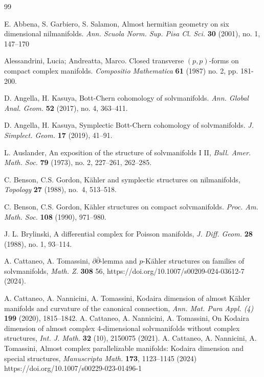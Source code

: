 \documentclass[a4paper, 11pt]{amsart}
\theoremstyle{plain}
\theoremstyle{definition}
\numberwithin{equation}{section}
\begin{document}
\newpage
\begin{thebibliography}{99}

 E. Abbena, S. Garbiero, S. Salamon, Almost hermitian geometry on six dimensional nilmanifolds. \textit{Ann. Scuola Norm. Sup. Pisa Cl. Sci.} \textbf{30} (2001), no. 1, 147--170

 Alessandrini, Lucia; Andreatta, Marco. Closed transverse $(p, p)$-forms on compact complex manifolds. \textit{Compositio Mathematica} \textbf{61} (1987) no. 2, pp. 181-200.

 D. Angella, H. Kasuya, Bott-Chern cohomology of solvmanifolds. {\em Ann. Global Anal. Geom.} \textbf{52} (2017), no. 4, 363--411.

 D. Angella, H. Kasuya, Symplectic Bott-Chern cohomology of solvmanifolds. \textit{J. Simplect. Geom.} \textbf{17} (2019), 41--91.

 L. Auslander, An exposition of the structure of solvmanifolds I II, \textit{Bull. Amer. Math. Soc.} \textbf{79} (1973), no. 2, 227--261, 262--285.

 C. Benson, C.S. Gordon, K\"ahler and symplectic
structures on nilmanifolds,
{\em Topology} \textbf{27} (1988), no.~4, 513--518.

 C. Benson, C.S. Gordon, K\"ahler structures on compact solvmanifolds. \textit{Proc. Am. Math. Soc.} \textbf{108} (1990), 971--980.

 J. L. Brylinski, A differential complex for Poisson manifolds, {\em J. Diff. Geom.} \textbf{28} (1988), no. 1, 93--114.

 A. Cattaneo, A. Tomassini, $\partial \bar{\partial }$-lemma and $p$-Kähler structures on families of solvmanifolds, {\em Math. Z.} \textbf{308} 56, https://doi.org/10.1007/s00209-024-03612-7 (2024).

 A. Cattaneo, A. Nannicini, A. Tomassini, Kodaira dimension of almost Kähler manifolds and curvature of the canonical connection, \textit{Ann. Mat. Pura Appl. (4)} {\bf 199} (2020), 1815--1842.
 A. Cattaneo, A. Nannicini, A. Tomassini, On Kodaira dimension of almost complex
4-dimensional solvmanifolds without complex structures, {\em Int. J. Math.} \textbf{32} (10), 2150075 (2021).
 A. Cattaneo, A. Nannicini, A. Tomassini, Almost complex parallelizable manifolds: Kodaira dimension and special structures, {\em Manuscripta Math.} \textbf{173}, 1123--1145 (2024) https://doi.org/10.1007/s00229-023-01496-1


\end{thebibliography}
\end{document}
